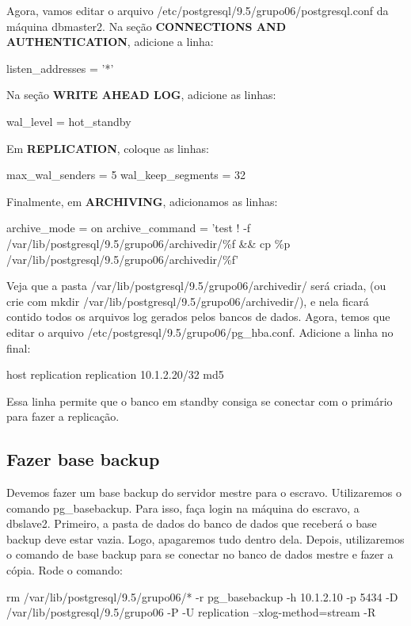 \documentclass[a4paper,10pt]{article}
\begin{document}
      Agora, vamos editar o arquivo /etc/postgresql/9.5/grupo06/postgresql.conf da máquina dbmaster2.
      Na seção \textbf{CONNECTIONS AND AUTHENTICATION}, adicione a linha:
          \begin{spverbatim}
              listen_addresses = '*'
          \end{spverbatim}

      Na seção \textbf{WRITE AHEAD LOG}, adicione as linhas:
          \begin{spverbatim}
              wal_level = hot_standby
          \end{spverbatim}

      Em \textbf{REPLICATION}, coloque as linhas:
          \begin{spverbatim}
              max_wal_senders = 5
              wal_keep_segments = 32
          \end{spverbatim}

      Finalmente, em \textbf{ARCHIVING}, adicionamos as linhas:
          \begin{spverbatim}
              archive_mode = on
              archive_command = 'test ! -f /var/lib/postgresql/9.5/grupo06/archivedir/\%f && cp \%p /var/lib/postgresql/9.5/grupo06/archivedir/\%f'
          \end{spverbatim}
      Veja que a pasta /var/lib/postgresql/9.5/grupo06/archivedir/ será criada, (ou crie com mkdir /var/lib/postgresql/9.5/grupo06/archivedir/), e nela ficará contido todos os arquivos log gerados pelos bancos de dados.
      Agora, temos que editar o arquivo /etc/postgresql/9.5/grupo06/pg\_hba.conf. Adicione a linha no final:
          \begin{spverbatim}
              host    replication     replication     10.1.2.20/32    md5
          \end{spverbatim}

          Essa linha permite que o banco em standby consiga se conectar com o primário para fazer a replicação.
    \subsection{Fazer base backup}
        Devemos fazer um base backup do servidor mestre para o escravo. Utilizaremos o comando pg\_basebackup.
        Para isso, faça login na máquina do escravo, a dbslave2.
        Primeiro, a pasta de dados do banco de dados que receberá o base backup deve estar vazia. Logo, apagaremos tudo dentro dela. Depois, utilizaremos o comando de base backup para se conectar no banco de dados mestre e fazer a cópia.
        Rode o comando:
          \begin{spverbatim}
              rm /var/lib/postgresql/9.5/grupo06/* -r
              pg_basebackup -h 10.1.2.10 -p 5434 -D /var/lib/postgresql/9.5/grupo06 -P -U replication --xlog-method=stream -R
          \end{spverbatim}
\end{document}
